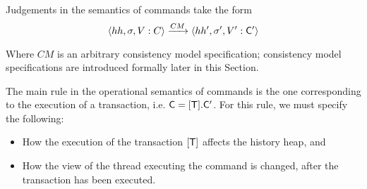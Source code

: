 \documentclass[a4paper,UKenglish]{article}%
\theoremstyle{plain}
\begin{document}
Judgements in the semantics of commands take the form 
\[ 
\langle hh, \sigma, V: C \rangle \xrightarrow{CM} \langle hh', \sigma', V': \mathsf{C}' \rangle
\]

Where 
$CM$ is an arbitrary consistency model specification; consistency model specifications 
are introduced formally later in this Section.

The main rule in the operational semantics of commands is the one corresponding 
to the execution of a transaction, i.e. $\mathsf{C} = [\mathsf{T}].\mathsf{C}'$. For this rule, we must specify the following: 
\begin{itemize}
\item How the execution of the transaction $[\mathsf{T}]$ affects the history heap, and 
\item How the view of the thread executing the command is changed, after the transaction 
has been executed. 
\end{itemize}
\end{document}
